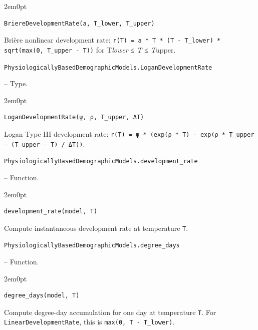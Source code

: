 \begin{adjustwidth}{2em}{0pt}


\begin{verbatim}
BriereDevelopmentRate(a, T_lower, T_upper)
\end{verbatim}

Brière nonlinear development rate: \texttt{r(T) = a * T * (T - T\_lower) * sqrt(max(0, T\_upper - T))} for T\emph{lower ≤ T ≤ T}upper.



\end{adjustwidth}
\hypertarget{18261369200953957202}{\texttt{PhysiologicallyBasedDemographicModels.LoganDevelopmentRate}}  -- {Type.}

\begin{adjustwidth}{2em}{0pt}


\begin{verbatim}
LoganDevelopmentRate(ψ, ρ, T_upper, ΔT)
\end{verbatim}

Logan Type III development rate: \texttt{r(T) = ψ * (exp(ρ * T) - exp(ρ * T\_upper - (T\_upper - T) / ΔT))}.



\end{adjustwidth}
\hypertarget{7606196020800589005}{\texttt{PhysiologicallyBasedDemographicModels.development\_rate}}  -- {Function.}

\begin{adjustwidth}{2em}{0pt}


\begin{verbatim}
development_rate(model, T)
\end{verbatim}

Compute instantaneous development rate at temperature \texttt{T}.



\end{adjustwidth}
\hypertarget{16311367940229150585}{\texttt{PhysiologicallyBasedDemographicModels.degree\_days}}  -- {Function.}

\begin{adjustwidth}{2em}{0pt}


\begin{verbatim}
degree_days(model, T)
\end{verbatim}

Compute degree-day accumulation for one day at temperature \texttt{T}. For \texttt{LinearDevelopmentRate}, this is \texttt{max(0, T - T\_lower)}.



\end{adjustwidth}

